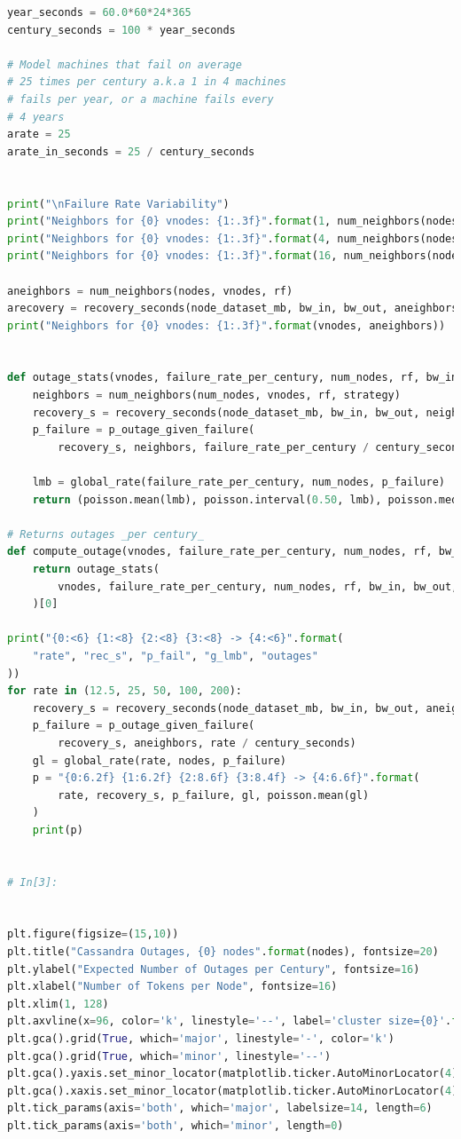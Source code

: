 \documentclass{article}
\begin{document}
\begin{lstlisting}[language=Python]
year_seconds = 60.0*60*24*365
century_seconds = 100 * year_seconds

# Model machines that fail on average
# 25 times per century a.k.a 1 in 4 machines
# fails per year, or a machine fails every
# 4 years
arate = 25
arate_in_seconds = 25 / century_seconds


print("\nFailure Rate Variability")
print("Neighbors for {0} vnodes: {1:.3f}".format(1, num_neighbors(nodes, 1, rf)))
print("Neighbors for {0} vnodes: {1:.3f}".format(4, num_neighbors(nodes, 4, rf)))
print("Neighbors for {0} vnodes: {1:.3f}".format(16, num_neighbors(nodes, 16, rf)))

aneighbors = num_neighbors(nodes, vnodes, rf)
arecovery = recovery_seconds(node_dataset_mb, bw_in, bw_out, aneighbors)
print("Neighbors for {0} vnodes: {1:.3f}".format(vnodes, aneighbors))


def outage_stats(vnodes, failure_rate_per_century, num_nodes, rf, bw_in, bw_out, strategy='rack'):
    neighbors = num_neighbors(num_nodes, vnodes, rf, strategy)
    recovery_s = recovery_seconds(node_dataset_mb, bw_in, bw_out, neighbors)
    p_failure = p_outage_given_failure(
        recovery_s, neighbors, failure_rate_per_century / century_seconds)

    lmb = global_rate(failure_rate_per_century, num_nodes, p_failure)
    return (poisson.mean(lmb), poisson.interval(0.50, lmb), poisson.median(lmb))

# Returns outages _per century_
def compute_outage(vnodes, failure_rate_per_century, num_nodes, rf, bw_in, bw_out, strategy='rack'):
    return outage_stats(
        vnodes, failure_rate_per_century, num_nodes, rf, bw_in, bw_out, strategy
    )[0]

print("{0:<6} {1:<8} {2:<8} {3:<8} -> {4:<6}".format(
    "rate", "rec_s", "p_fail", "g_lmb", "outages"
))
for rate in (12.5, 25, 50, 100, 200):
    recovery_s = recovery_seconds(node_dataset_mb, bw_in, bw_out, aneighbors)
    p_failure = p_outage_given_failure(
        recovery_s, aneighbors, rate / century_seconds)
    gl = global_rate(rate, nodes, p_failure)
    p = "{0:6.2f} {1:6.2f} {2:8.6f} {3:8.4f} -> {4:6.6f}".format(
        rate, recovery_s, p_failure, gl, poisson.mean(gl)
    )
    print(p)


# In[3]:


plt.figure(figsize=(15,10))
plt.title("Cassandra Outages, {0} nodes".format(nodes), fontsize=20)
plt.ylabel("Expected Number of Outages per Century", fontsize=16)
plt.xlabel("Number of Tokens per Node", fontsize=16)
plt.xlim(1, 128)
plt.axvline(x=96, color='k', linestyle='--', label='cluster size={0}'.format(nodes))
plt.gca().grid(True, which='major', linestyle='-', color='k')
plt.gca().grid(True, which='minor', linestyle='--')
plt.gca().yaxis.set_minor_locator(matplotlib.ticker.AutoMinorLocator(4))
plt.gca().xaxis.set_minor_locator(matplotlib.ticker.AutoMinorLocator(4))
plt.tick_params(axis='both', which='major', labelsize=14, length=6)
plt.tick_params(axis='both', which='minor', length=0)


\end{lstlisting}
\end{document}
